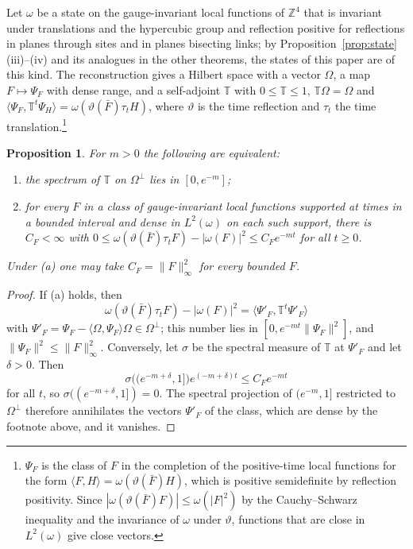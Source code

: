 \documentclass[11pt]{amsart}
\newtheorem{proposition}[theorem]{Proposition}
\theoremstyle{definition}
\theoremstyle{remark}
\numberwithin{equation}{section}
\newcommand{\Z}{\mathbb{Z}}
\newcommand{\ip}[2]{\langle #1,#2\rangle}
\begin{document}
Let $\omega$ be a state on the gauge-invariant local functions of $\Z^4$ that
is invariant under translations and the hypercubic group and reflection
positive for reflections in planes through sites and in planes bisecting
links; by Proposition~\ref{prop:state}(iii)--(iv) and its analogues in the
other theorems, the states of this paper are of this kind. The reconstruction gives a Hilbert space with a
vector $\Omega$, a map $F\mapsto\Psi_F$ with dense range, and a self-adjoint
$\mathbb T$ with $0\le\mathbb T\le1$, $\mathbb T\Omega=\Omega$ and
$\ip{\Psi_F}{\mathbb T^t\Psi_H}=\omega(\vartheta(\bar F)\tau_tH)$, where
$\vartheta$ is the time reflection and $\tau_t$ the time
translation.\footnote{$\Psi_F$ is the class of $F$ in the completion of the
positive-time local functions for the form $\ip FH=\omega(\vartheta(\bar F)H)$,
which is positive semidefinite by reflection positivity. Since
$|\omega(\vartheta(\bar F)F)|\le\omega(|F|^2)$ by the Cauchy--Schwarz
inequality and the invariance of $\omega$ under $\vartheta$, functions that are
close in $L^2(\omega)$ give close vectors.}

\begin{proposition}\label{prop:gapdecay}
For $m>0$ the following are equivalent:
\begin{enumerate}[label=\textup{(\alph*)},leftmargin=*]
\item the spectrum of $\mathbb T$ on $\Omega^\perp$ lies in $[0,e^{-m}]$;
\item for every $F$ in a class of gauge-invariant local functions supported
at times in a bounded interval and dense in $L^2(\omega)$ on each such support,
there is $C_F<\infty$ with $0\le\omega(\vartheta(\bar F)\tau_tF)-|\omega(F)|^2
\le C_Fe^{-mt}$ for all $t\ge0$.
\end{enumerate}
Under \textup{(a)} one may take $C_F=\|F\|_\infty^2$ for every bounded $F$.
\end{proposition}

\begin{proof}
If (a) holds, then
\[
\omega(\vartheta(\bar F)\tau_tF)-|\omega(F)|^2=\ip{\Psi'_F}{\mathbb
T^t\Psi'_F}
\]
with $\Psi'_F=\Psi_F-\ip\Omega{\Psi_F}\Omega\in\Omega^\perp$; this number lies
in $[0,e^{-mt}\|\Psi_F\|^2]$, and $\|\Psi_F\|^2\le\|F\|_\infty^2$.
Conversely, let $\sigma$ be the spectral measure of $\mathbb T$ at
$\Psi'_F$ and let $\delta>0$. Then
\[
\sigma\bigl((e^{-m+\delta},1]\bigr)e^{(-m+\delta)t}\le C_Fe^{-mt}
\]
for all $t$, so $\sigma((e^{-m+\delta},1])=0$.
The spectral projection of $(e^{-m},1]$ restricted to $\Omega^\perp$ therefore
annihilates the vectors $\Psi'_F$ of the class, which are dense by the
footnote above, and it vanishes.
\end{proof}
\end{document}
